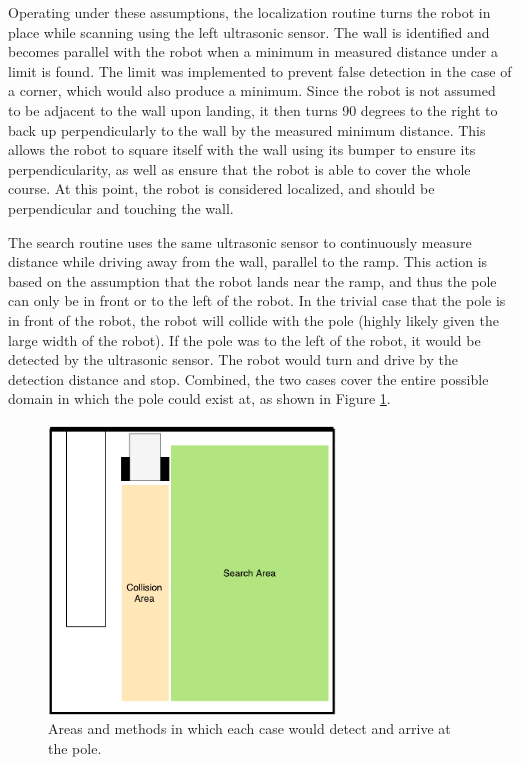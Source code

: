 \documentclass[ece]{uw-wkrpt}
\begin{document}
Operating under these assumptions, the localization routine turns the robot in place while scanning using the left ultrasonic sensor. The wall is identified and becomes parallel with the robot when a minimum in measured distance under a limit is found. The limit was implemented to prevent false detection in the case of a corner, which would also produce a minimum. Since the robot is not assumed to be adjacent to the wall upon landing, it then turns 90 degrees to the right to back up perpendicularly to the wall by the measured minimum distance. This allows the robot to square itself with the wall using its bumper to ensure its perpendicularity, as well as ensure that the robot is able to cover the whole course. At this point, the robot is considered localized, and should be perpendicular and touching the wall.  

The search routine uses the same ultrasonic sensor to continuously measure distance while driving away from the wall, parallel to the ramp. This action is based on the assumption that the robot lands near the ramp, and thus the pole can only be in front or to the left of the robot. In the trivial case that the pole is in front of the robot, the robot will collide with the pole (highly likely given the large width of the robot). If the pole was to the left of the robot, it would be detected by the ultrasonic sensor. The robot would turn and drive by the detection distance and stop. Combined, the two cases cover the entire possible domain in which the pole could exist at, as shown in Figure \ref{fig:SAAreas}. 

\begin{figure}
    \centering
    \includegraphics[width=3in]{res/SA-Areas}
    \caption[Areas and methods in which each case would detect and arrive at the pole]
          {Areas and methods in which each case would detect and arrive at the pole.}
    \label{fig:SAAreas}
\end{figure}
\end{document}
